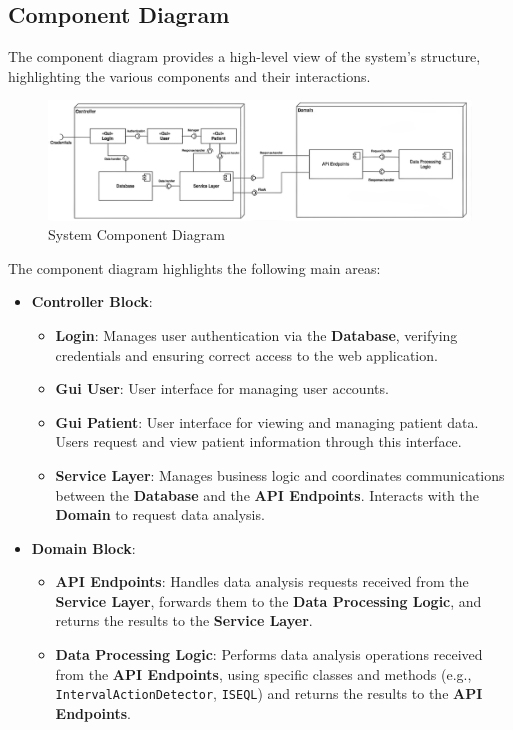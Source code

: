 \documentclass{article}
\begin{document}
\subsection{Component Diagram}
The component diagram provides a high-level view of the system's structure, highlighting the various components and their interactions.
\pagebreak
\begin{figure}[h]
\centering
\includegraphics[width=1.0\textwidth,height=0.21\textheight]{Images/Diagrams/component.png}
\caption{System Component Diagram}
\end{figure}


The component diagram highlights the following main areas:

\begin{itemize}
    \item \textbf{Controller Block}:
    \begin{itemize}
        \item \textbf{Login}: Manages user authentication via the \textbf{Database}, verifying credentials and ensuring correct access to the web application.
        \item \textbf{Gui User}: User interface for managing user accounts.
        \item \textbf{Gui Patient}: User interface for viewing and managing patient data. Users request and view patient information through this interface.
        \item \textbf{Service Layer}: Manages business logic and coordinates communications between the \textbf{Database} and the \textbf{API Endpoints}. Interacts with the \textbf{Domain} to request data analysis.
    \end{itemize}
    
    \item \textbf{Domain Block}:
    \begin{itemize}
        \item \textbf{API Endpoints}: Handles data analysis requests received from the \textbf{Service Layer}, forwards them to the \textbf{Data Processing Logic}, and returns the results to the \textbf{Service Layer}.
        \item \textbf{Data Processing Logic}: Performs data analysis operations received from the \textbf{API Endpoints}, using specific classes and methods (e.g., \texttt{IntervalActionDetector}, \texttt{ISEQL}) and returns the results to the \textbf{API Endpoints}.
    \end{itemize}
\end{itemize}
\end{document}
